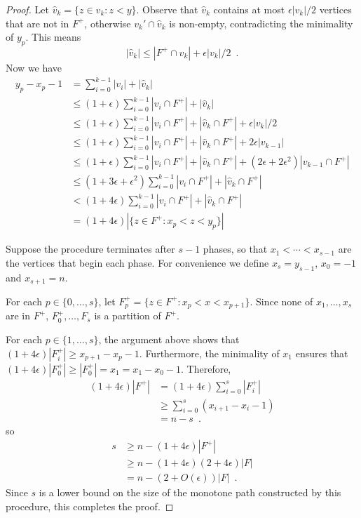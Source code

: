 \documentclass{patmorin}
\begin{document}
\begin{proof}
  Let $\hat{v}_k=\{z\in v_k:z< y\}$.  Observe that $\hat{v}_k$ contains
  at most $\epsilon|v_k|/2$ vertices that are not in $F^+$, otherwise
  $v_k'\cap \hat{v}_k$ is non-empty, contradicting the minimality of $y_p$. 
  This means
  \[    |\hat{v}_k| \le |F^+\cap \hat{v}_k| + \epsilon|v_k|/2 \enspace .
  \]
  Now we have
  \begin{align*}
	  y_p - x_p - 1 & = \sum_{i=0}^{k-1} |v_i| + |\hat{v}_k|  \\
	  & \le (1+\epsilon)\sum_{i=0}^{k-1} |v_i\cap F^+| + |\hat{v}_k| \\
	  & \le (1+\epsilon)\sum_{i=0}^{k-1} |v_i\cap F^+| + |\hat{v}_k\cap F^+| + \epsilon|v_k|/2 \\ 
	  & \le  (1+\epsilon)\sum_{i=0}^{k-1}|v_i\cap F^+| + |\hat{v}_k\cap F^+| + 2\epsilon|v_{k-1}| \\ 
	  & \le  (1+\epsilon)\sum_{i=0}^{k-1}|v_i\cap F^+| + |\hat{v}_k\cap F^+| + (2\epsilon+2\epsilon^2)|v_{k-1}\cap F^+| \\ 
	  & \le  (1+3\epsilon+\epsilon^2)\sum_{i=0}^{k-1}|v_i\cap F^+| + |\hat{v}_k\cap F^+| \\
	  & <  (1+4\epsilon)\sum_{i=0}^{k-1}|v_i\cap F^+| + |\hat{v}_k\cap F^+|  \\
	  & =  (1+4\epsilon)|\{z\in F^+: x_p< z< y_p\}|
  \end{align*}

  Suppose the procedure terminates after $s-1$ phases, so that $x_1<\cdots<x_{s-1}$ are the vertices that begin each phase.  For convenience we define $x_s=y_{s-1}$, $x_0=-1$ and $x_{s+1}=n$.

  For each $p\in\{0,\ldots,s\}$, let $F_p^+=\{z\in F^+: x_p <
  x < x_{p+1}\}$.  Since none of $x_1,\ldots,x_s$ are in $F^+$,
  $F_0^+,\ldots,F_{s}$ is a partition of $F^+$.  

 For each $p\in\{1,\ldots,s\}$, the argument above shows that $(1+4\epsilon)|F_i^+|\ge x_{p+1}-x_p-1$.
  Furthermore, the minimality of $x_1$ ensures that $(1+4\epsilon)|F_0^+|\ge |F_0^+|=x_1=x_1-x_0-1$.  
   Therefore,
  \begin{align*}
	  (1+4\epsilon)|F^+| & = (1+4\epsilon)\sum_{i=0}^s |F^+_i| \\
		& \ge \sum_{i=0}^s (x_{i+1}-x_i-1) \\
		& = n-s \enspace .
  \end{align*}
  so 
  \begin{align*}
	  s & \ge n-(1+4\epsilon)|F^+| \\
	  & \ge n-(1+4\epsilon)(2+4\epsilon)|F|\\
	  & =n-(2+O(\epsilon))|F| \enspace . 
  \end{align*}
  Since $s$ is a lower bound on the size of the monotone path
  constructed by this procedure, this completes the proof.
\end{proof}
\end{document}
